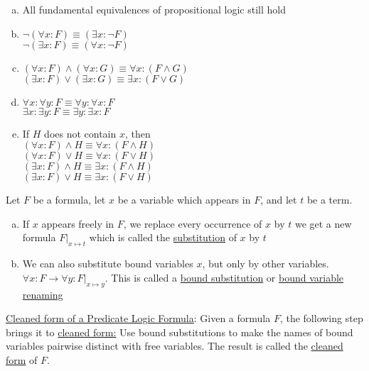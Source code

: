 \documentclass[a4paper]{article}
\newcommand{\ul}{\underline}
\begin{document}
\begin{enumerate}[(a)]
	\item All fundamental equivalences of propositional logic still hold
	\item $\neg(\forall x:F)\equiv (\exists x:\neg F)$\\
	$\neg(\exists x:F)\equiv (\forall x:\neg F)$
	\item $(\forall x : F)\wedge (\forall x : G)\equiv \forall x : (F\wedge G)$\\
	$(\exists x : F)\vee (\exists x : G)\equiv \exists x : (F\vee G)$
	\item $\forall x:\forall y: F\equiv\forall y:\forall x:F$\\
	$\exists x:\exists y: F\equiv\exists y:\exists x:F$
	\item If $H$ does not contain $x$, then\\
	$(\forall x: F)\wedge H\equiv \forall x:(F\wedge H)$\\
	$(\forall x: F)\vee H\equiv \forall x:(F\vee H)$\\
	$(\exists x: F)\wedge H\equiv \exists x:(F\wedge H)$\\
	$(\exists x: F)\vee H\equiv \exists x:(F\vee H)$\\
\end{enumerate}
Let $F$ be a formula, let $x$ be a variable which appears in $F$, and let $t$ be a term.
\begin{enumerate}[(a)]
	\item If $x$ appears freely in $F$, we replace every occurrence of $x$ by $t$ we get a new formula $F\vert_{x\mapsto t}$ which is called the \ul{substitution} of $x$ by $t$
	\item We can also substitute bound variables $x$, but only by other variables. $\forall x:F\rightarrow \forall y:F\vert_{x\mapsto y}$. This is called a \ul{bound substitution} or \ul{bound variable renaming}
\end{enumerate}
\ul{Cleaned form of a Predicate Logic Formula}: Given a formula $F$, the following step brings it to \ul{cleaned form:} Use bound substitutions to make the names of bound variables pairwise distinct with free variables. The result is called the \ul{cleaned form} of $F$.
\end{document}
